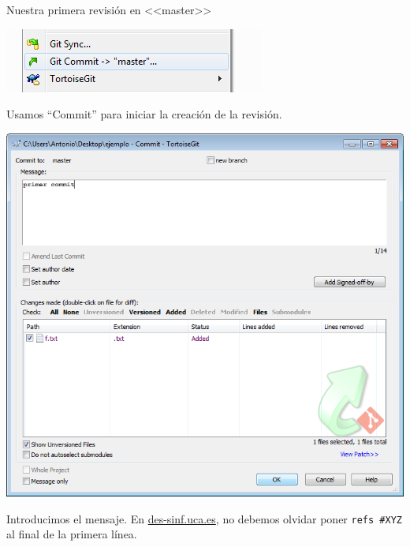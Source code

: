 \documentclass[xcolor=svgnames]{beamer}
\begin{document}
\begin{frame}[t]{Nuestra primera revisión en <<master>>}
\begin{overprint}
\begin{center}
      \includegraphics[width=\textwidth,height=.6\textheight,keepaspectratio]{tomas/primercommit-03-commit}

      \vspace{.15\textheight}

      Usamos ``Commit'' para iniciar la creación de la revisión.
    \end{center}

    \begin{center}
      \includegraphics[width=\textwidth,height=.6\textheight,keepaspectratio]{tomas/primercommit-04-dlgcommit}

      \vfill

      Introducimos el mensaje. En \url{des-sinf.uca.es}, no debemos olvidar poner \texttt{refs \#{}XYZ} al final de la primera línea.
    \end{center}


\end{overprint}
\end{frame}
\end{document}
